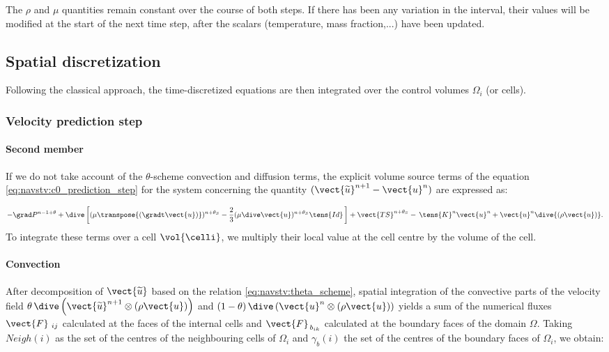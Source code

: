 \begin{remark}
The  $\rho$ and $\mu$ quantities remain constant over the course of both
steps. If there has been any variation in the interval, their values will be modified at the start of the next time step, after the scalars (temperature, mass fraction,...) have been updated.
\end{remark}

\subsection*{Spatial discretization}
Following the classical approach, the time-discretized equations are then integrated over the control volumes ${\Omega_i}$ (or cells).
\subsubsection*{Velocity prediction step}
\paragraph{Second member\\ }
If we do not take account of the $\theta$-scheme convection and diffusion
terms, the explicit volume source terms of the equation \eqref{eq:navstv:c0_prediction_step}
for the system concerning the quantity $(\vect{\widetilde{u}}^{n+1}-\vect {u}^{n})$
	are expressed as:

\begin{equation*}
 -\grad P^{n-1+\theta} + \dive \left[ (\mu \transpose{ \left( \gradt \vect{u}\right) })^{n+\theta_{S}}- \frac{2}{3} ( \mu  \dive \vect{u})^{n+\theta_{S}}\tens{Id} \,\right]+\vect{TS}^{n+\theta_{S}}- \,\tens{K}^{n} \vect{u}^{n}+\vect{u}^{n} \dive{(\rho\vect{u})}.
 \end{equation*}
To integrate these terms over a cell $\vol{\celli}$, we multiply their local value
at the cell centre by the volume of the cell.

\paragraph{Convection  \\}

After decomposition of $\vect{\widetilde{u}}$ based on the relation
\eqref{eq:navstv:theta_scheme}, spatial integration of the convective
parts of the velocity field $\theta\,{\dive\left(\vect{\widetilde{u}}^{n+1}\otimes
(\rho \vect{u})\right)}$ and $(1-\theta)\,{\dive\left(
\vect{u}^{n}\otimes (\rho \vect{u})\right)}$ yields a sum of the numerical
fluxes ${\vect{F}\,_{\,ij}}$ calculated at the faces of the internal cells and ${\vect{F}_{\,b_{ik}}}$ calculated at the boundary faces of the domain $\Omega$.
Taking $Neigh(i)$ as the set of the centres of the neighbouring cells of
${\Omega_i}$ and $\gamma_b(i)$ the set of the centres of the boundary faces of
${\Omega_i}$, we obtain:

